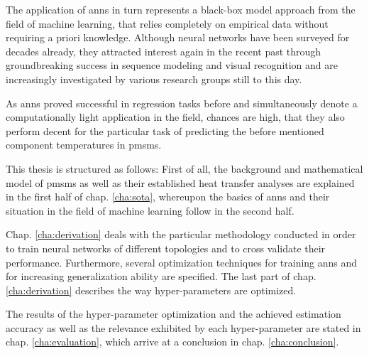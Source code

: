 The application of \glspl{ann} in turn represents a black-box model approach from the field of machine learning, that relies completely on empirical data without requiring a priori knowledge.
Although neural networks have been surveyed for decades already, they attracted interest again in the recent past through groundbreaking success in sequence modeling and visual recognition and are increasingly investigated by various research groups still to this day.

As \glspl{ann} proved successful in regression tasks before and simultaneously denote a computationally light application in the field, chances are high, that they also perform decent for the particular task of predicting the before mentioned component temperatures in \glspl{pmsm}.

This thesis is structured as follows:
First of all, the background and mathematical model of \glspl{pmsm} as well as their established heat transfer analyses are explained in the first half of chap. \ref{cha:sota}, whereupon the basics of \glspl{ann} and their situation in the field of machine learning follow in the second half.

Chap. \ref{cha:derivation} deals with the particular methodology conducted in order to train neural networks of different topologies and to cross validate their performance.
Furthermore, several optimization techniques for training \glspl{ann} and for increasing generalization ability are specified.
The last part of chap. \ref{cha:derivation} describes the way hyper-parameters are optimized.

The results of the hyper-parameter optimization and the achieved estimation accuracy as well as the relevance exhibited by each hyper-parameter are stated in chap. \ref{cha:evaluation}, which arrive at a conclusion in chap. \ref{cha:conclusion}.
